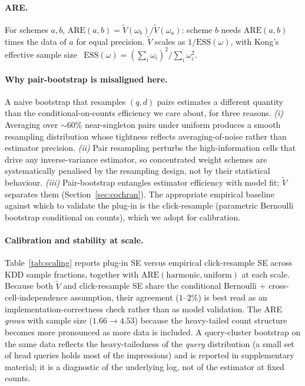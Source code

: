 \documentclass[sigconf]{acmart}
\begin{document}
\paragraph{ARE.} For schemes $a,b$,
$\mathrm{ARE}(a,b)=\widetilde V(\omega_b)/\widetilde V(\omega_a)$:
scheme $b$ needs $\mathrm{ARE}(a,b)$ times the data of $a$ for equal
precision. $\widetilde V$ scales as $1/\mathrm{ESS}(\omega)$, with
Kong's effective sample size~\cite{kong1992ess}
$\mathrm{ESS}(\omega)=(\sum_i\omega_i)^2/\sum_i\omega_i^2$.

\paragraph{Why pair-bootstrap is misaligned here.}
A naive bootstrap that resamples $(q,d)$ pairs estimates a different
quantity than the conditional-on-counts efficiency we care about, for three
reasons. \emph{(i)} Averaging over $\sim 60\%$ near-singleton pairs under
uniform produces a smooth resampling distribution whose tightness reflects
averaging-of-noise rather than estimator precision. \emph{(ii)} Pair
resampling perturbs the high-information cells that drive any
inverse-variance estimator, so concentrated weight schemes are
systematically penalised by the resampling design, not by their statistical
behaviour. \emph{(iii)} Pair-bootstrap entangles estimator efficiency with
model fit; $\widetilde V$ separates them (Section~\ref{sec:cochran}).
The appropriate empirical baseline against which to validate the plug-in
is the click-resample (parametric Bernoulli bootstrap conditional on
counts), which we adopt for calibration.

\paragraph{Calibration and stability at scale.}
Table~\ref{tab:scaling} reports plug-in SE versus empirical
click-resample SE across KDD sample fractions, together with
$\mathrm{ARE}(\text{harmonic},\text{uniform})$ at each scale. Because
both $\widetilde V$ and click-resample SE share the conditional
Bernoulli + cross-cell-independence assumption, their agreement
($1$--$2\%$) is best read as an implementation-correctness check
rather than as model validation. The ARE \emph{grows} with sample
size ($1.66\to 4.53$) because the heavy-tailed count structure
becomes more pronounced as more data is included. A query-cluster
bootstrap on the same data reflects the heavy-tailedness of the
\emph{query} distribution (a small set of head queries holds most of
the impressions) and is reported in supplementary material; it is a
diagnostic of the underlying log, not of the estimator at fixed
counts.
\end{document}
